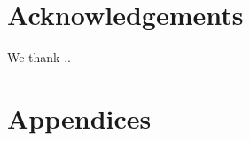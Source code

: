 \documentclass[12pt,aps,preprint,nofootinbib]{revtex4}
\begin{document}
\maketitle




%




\section*{Acknowledgements}
We thank ..

\clearpage



\newpage


\clearpage
\appendices
\section*{Appendices}

\clearpage

\end{document}
